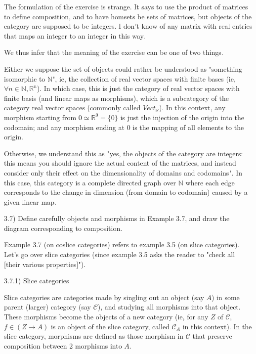 The formulation of the exercise is strange. It says to use the product of matrices to define composition, and to have homsets be sets of matrices, but objects of the category are supposed to be integers. I don't know of any matrix with real entries that maps an integer to an integer in this way.

We thus infer that the meaning of the exercise can be one of two things.

Either we suppose the set of objects could rather be understood as "something isomorphic to $\mathbb{N}$", ie, the collection of real vector spaces with finite bases (ie, $\forall n \in \mathbb{N}, \mathbb{R}^n$). In which case, this is just the category of real vector spaces with finite basis (and linear maps as morphisms), which is a subcategory of the category real vector spaces (commonly called $Vect_{\mathbb{R}}$). In this context, any morphism starting from $0 \simeq \mathbb{R}^0 = \{0\}$ is just the injection of the origin into the codomain; and any morphism ending at $0$ is the mapping of all elements to the origin.

Otherwise, we understand this as "yes, the objects of the category are integers: this means you should ignore the actual content of the matrices, and instead consider only their effect on the dimensionality of domains and codomains". In this case, this category is a complete directed graph over $\mathbb{N}$ where each edge corresponds to the change in dimension (from domain to codomain) caused by a given linear map.



3.7) Deﬁne carefully objects and morphisms in Example 3.7, and draw the diagram corresponding to composition.

Example 3.7 (on coslice categories) refers to example 3.5 (on slice categories). Let's go over slice categories (since example 3.5 asks the reader to "check all [their various properties]").

3.7.1) Slice categories

Slice categories are categories made by singling out an object (say $A$) in some parent (larger) category (say $\mathcal{C}$), and studying all morphisms into that object. These morphisms become the objects of a new category (ie, for any $Z$ of $\mathcal{C}$, $f \in (Z \to A)$ is an object of the slice category, called $\mathcal{C}_A$ in this context). In the slice category, morphisms are defined as those morphism in $\mathcal{C}$ that preserve composition between 2 morphisms into $A$.

